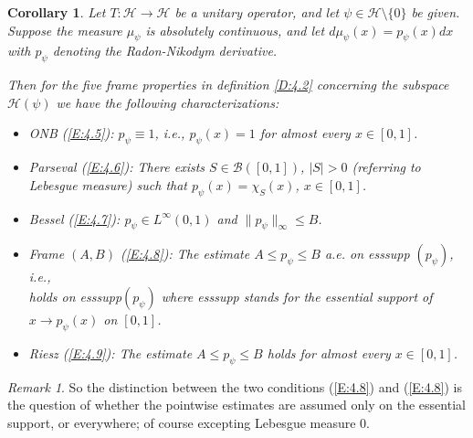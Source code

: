 \documentclass{birkmult}
\newtheorem{cor}[thm]{Corollary}
\theoremstyle{definition}
\theoremstyle{remark}
\newtheorem{rem}[thm]{Remark}
\numberwithin{equation}{section}
\begin{document}
\begin{cor}
\label{C:4.4}
Let $T: \mathcal{H} \to \mathcal{H}$ be a unitary operator, and let 
$\psi \in \mathcal{H} \setminus \{0\}$ be given.  Suppose the measure
$\mu_{\psi}$ is absolutely continuous, and let 
$d\mu_{\psi}(x) = p_{\psi}(x)dx$ with $p_{\psi}$ denoting the Radon-Nikodym 
derivative.

Then for the five frame properties in definition \ref{D:4.2} concerning 
the subspace $\mathcal{H}(\psi)$ we have the following characterizations:

\begin{itemize}
  \item ONB (\ref{E:4.5}): $p_{\psi} \equiv 1$, i.e., $p_{\psi}(x) = 1$
  for almost every $x \in [0,1]$. \\
  \item \textit{Parseval} (\ref{E:4.6}): There exists 
  $S \in \mathcal{B}([0,1])$, $|S|>0$ (referring to Lebesgue measure) 
  such that $p_{\psi}(x) = \chi_{S}(x)$, $x \in [0,1]$. \\    
  \item \textit{Bessel} (\ref{E:4.7}): $p_{\psi} \in L^{\infty}(0,1)$ and 
  $\|p_{\psi}\|_{\infty} \leq B$. \\
  \item \textit{Frame} $(A,B)$ (\ref{E:4.8}): The estimate 
  $A \leq p_{\psi} \leq B$ a.e. on esssupp $(p_{\psi})$, i.e.,  \\
  holds on esssupp$(p_{\psi})$ where esssupp stands for the essential 
  support of $x \to p_{\psi}(x)$ on $[0,1]$.  \\
  \item \textit{Riesz} (\ref{E:4.9}): The estimate 
  $A \leq p_{\psi} \leq B$ holds for almost every $x \in [0,1]$.   
\end{itemize}
\end{cor}
  
\begin{rem}
\label{R:4.5}
So the distinction between the two conditions (\ref{E:4.8}) and 
(\ref{E:4.8}) is the question of whether the pointwise estimates are 
assumed only on the essential support, or everywhere; of course 
excepting Lebesgue measure $0$.  
\end{rem}
\end{document}

